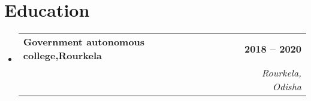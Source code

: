 \documentclass[letterpaper,11pt]{article}
\makeatletter
\newcommand{\resumeSubheading}[4]{
  \vspace{-2pt}\item
    \begin{tabular*}{1.0\textwidth}[t]{l@{\extracolsep{\fill}}r}
      \textbf{\large#1} & \textbf{\small #2} \\
      \textit{\large#3} & \textit{\small #4} \\
      
    \end{tabular*}\vspace{-7pt}
}
\newcommand{\resumeSubHeadingListStart}{\begin{itemize}[leftmargin=0.0in, label={}]}
\newcommand{\resumeSubHeadingListEnd}{\end{itemize}}
\makeatother
\begin{document}
\section{Education}
    \resumeSubHeadingListStart
        \resumeSubheading{Government autonomous college,Rourkela \href{Certificate Proof link}{\raisebox{-0.1\height}\faExternalLink } }{2018 -- 2020}{\bold{        Master of science in Statistics ( Sambalpur University )	       
            
               

}}{ Rourkela,  Odisha}
          
            
    \resumeSubHeadingListEnd
 \vspace{-11pt}
 
\end{document}
